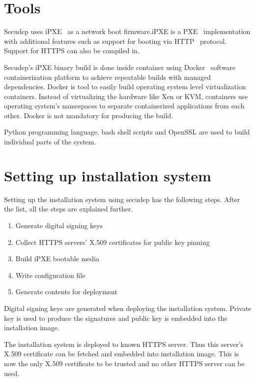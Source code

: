 \section{Tools}

Secudep uses iPXE~\cite{iPXE} as a network boot firmware.\@ iPXE is a
PXE~\cite{PXEspec} implementation with additional features such as
support for booting via HTTP~\cite{RFC2616} protocol. Support for
HTTPS can also be compiled in.\@

Secudep's iPXE binary build is done inside container using
Docker~\cite{Docker} software containerization platform to achieve
repeatable builds with managed dependencies. Docker is tool to easily
build operating system level virtualization~\cite{Soltesz2007}
containers. Instead of virtualizing the hardware like Xen or KVM,
containers use operating system's namespaces to separate containerized
applications from each other. Docker is not mandatory for producing
the build.

Python programming language, bash shell scripts and OpenSSL are used
to build individual parts of the system.

\section{Setting up installation system}

Setting up the installation system using secudep has the following
steps. After the list, all the steps are explained further.

\begin{enumerate}
  \item Generate digital signing keys
  \item Collect HTTPS servers' X.509 certificates for public key pinning
  \item Build iPXE bootable media
  \item Write configuration file
  \item Generate contents for deployment
\end{enumerate}

Digital signing keys are generated when deploying the installation
system. Private key is used to produce the signatures and
public key is embedded into the installation image.

The installation system is deployed to known HTTPS server. Thus this
server's X.509 certificate can be fetched and embedded into
installation image. This is now the only X.509 certificate to be
trusted and no other HTTPS server can be used.

